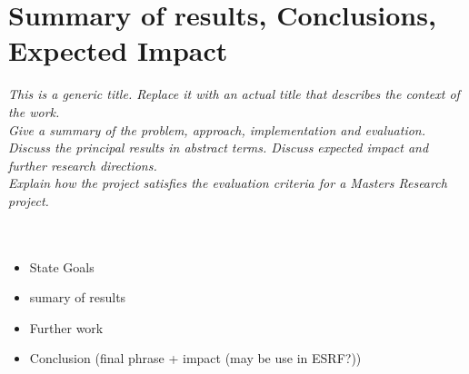 \chapter{Summary of results, Conclusions, Expected Impact}
\textit{This is a generic title. Replace it with an actual title that describes the context of the work.\\
 Give a summary of the problem, approach, implementation and evaluation. Discuss the principal results in abstract terms.  Discuss expected impact and further research directions.\\
Explain how the project satisfies the evaluation criteria for a Masters Research project.}\\
\\
\\
\begin{itemize}
	\item State Goals
	\item sumary of results
	\item Further work
	\item Conclusion (final phrase + impact (may be use in ESRF?))
\end{itemize}
